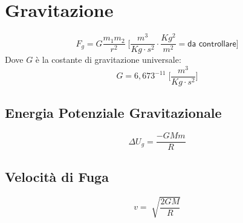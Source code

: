 \chapter*{Gravitazione}

\begin{equation*}
    F_g = G\frac{m_1m_2}{r^2} \; \Bigg[\frac{m^3}{Kg\cdot s^2} \cdot
    \frac{Kg^2}{m^2} = \textsf{da controllare} \Bigg]
\end{equation*}
Dove $G$ è la costante di gravitazione universale:
\begin{equation*}
    G = 6,673^{-11} \;\Bigg[\frac{m^3}{Kg\cdot s^2}\Bigg]
\end{equation*}
    
    \section*{Energia Potenziale Gravitazionale}
        \begin{equation*}
            \Delta U_g = \frac{-GMm}{R}
        \end{equation*}
   
    \section*{Velocità di Fuga}
        \begin{equation*}
            v = \sqrt[]{\frac{2GM}{R}}
        \end{equation*}